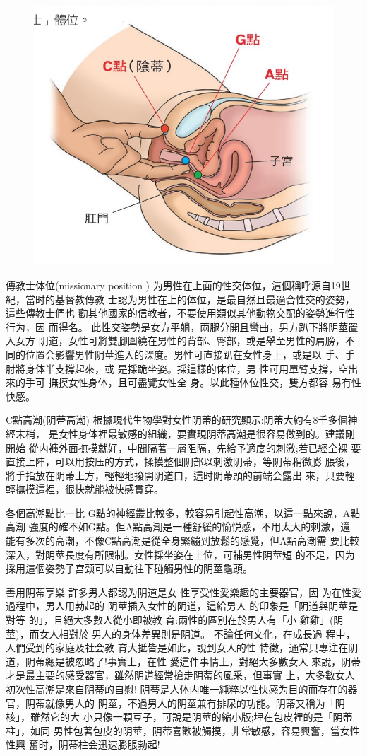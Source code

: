 \documentclass[12pt,UTF8]{ctexbook}
\begin{document}
\begin{figure}[htbp]
	\centering
	\includegraphics[width=0.7\linewidth]{16}
	\caption{}
	\label{fig:1}
\end{figure}

傳教士体位(missionary position )
为男性在上面的性交体位，這個稱呼源自19世紀，當时的基督教傳教
士認为男性在上的体位，是最自然且最適合性交的姿勢，這些傳教士們也
勸其他國家的信教者，不要使用類似其他動物交配的姿勢進行性行为，因
而得名。
此性交姿勢是女方平躺，兩腿分開且彎曲，男方趴下將阴莖置入女方
阴道，女性可將雙腳圍繞在男性的背部、臀部，或是舉至男性的肩膀，不
同的位置会影響男性阴莖進入的深度。男性可直接趴在女性身上，或是以
手、手肘將身体半支撐起來，或
是採跪坐姿。採這樣的体位，男
性可用單臂支撐，空出來的手可
撫摸女性身体，且可盡覽女性全
身。以此種体位性交，雙方都容
易有性快感。

C點高潮(阴蒂高潮)
根據現代生物學對女性阴蒂的研究顯示:阴蒂大約有8千多個神經末梢，
是女性身体裡最敏感的組織，要實現阴蒂高潮是很容易做到的。建議剛開始
從内褲外面撫摸就好，中間隔著一層阻隔，先給予適度的刺激;若已經全裸
要直接上陣，可以用按压的方式，揉摸整個阴部以刺激阴蒂，等阴蒂稍微膨
脹後，將手指放在阴蒂上方，輕輕地撥開阴道口，這时阴蒂頭的前端会露出
來，只要輕輕撫摸這裡，很快就能被快感貫穿。

各個高潮點比一比
G點的神經叢比較多，較容易引起性高潮，以這一點來說，A點高潮
強度的確不如G點。但A點高潮是一種舒緩的愉悦感，不用太大的刺激，還
能有多次的高潮，不像C點高潮是從全身緊繃到放鬆的感覺，但A點高潮需
要比較深入，對阴莖長度有所限制。女性採坐姿在上位，可補男性阴莖短
的不足，因为採用這個姿勢子宫颈可以自動往下碰觸男性的阴莖龜頭。

善用阴蒂享樂
許多男人都認为阴道是女
性享受性愛樂趣的主要器官，因
为在性愛過程中，男人用勃起的
阴莖插入女性的阴道，這給男人
的印象是「阴道與阴莖是對等
的」，且絕大多數人從小即被教
育:兩性的區別在於男人有「小
雞雞」(阴莖)，而女人相對於
男人的身体差異則是阴道。
不論任何文化，在成長過
程中，人們受到的家庭及社会教
育大抵皆是如此，說到女人的性
特徵，通常只專注在阴道，阴蒂總是被忽略了!事實上，在性
愛這件事情上，對絕大多數女人
來說，阴蒂才是最主要的感受器官，雖然阴道經常搶走阴蒂的風采，但事實
上，大多數女人初次性高潮是來自阴蒂的自慰!
阴蒂是人体内唯一純粹以性快感为目的而存在的器官，阴蒂就像男人的
阴莖，不過男人的阴莖兼有排尿的功能。阴蒂又稱为「阴核」，雖然它的大
小只像一顆豆子，可說是阴莖的縮小版;埋在包皮裡的是「阴蒂柱」，如同
男性包著包皮的阴莖，阴蒂喜歡被觸摸，非常敏感，容易興奮，當女性性興
奮时，阴蒂柱会迅速膨脹勃起!
\end{document}

